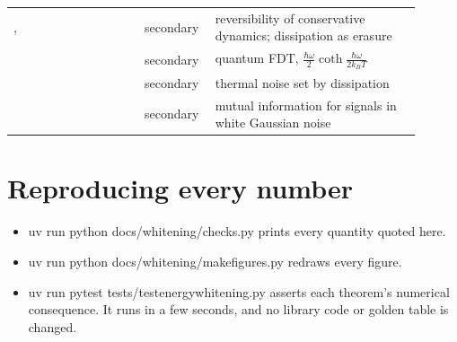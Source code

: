 \documentclass[11pt]{article}
\theoremstyle{definition}
\theoremstyle{remark}
\newcommand{\codeus}{\textunderscore\allowbreak}
\newcommand{\code}[1]{{\ttfamily\let\_\codeus\hyphenchar\font=-1 #1}}
\begin{document}
\begin{center}
\begin{tabular}{>{\raggedright}p{0.30\linewidth}p{0.13\linewidth}>{\raggedright\arraybackslash}p{0.47\linewidth}}
\citet{landauer1961irreversibility}, \citet{bennett1982thermodynamics} & secondary & reversibility of conservative dynamics; dissipation as erasure\\
\citet{callen1951irreversibility} & secondary & quantum FDT, $\frac{\hbar\omega}{2}\coth\frac{\hbar\omega}{2k_BT}$\\
\citet{nyquist1928thermal} & secondary & thermal noise set by dissipation\\
\citet{duncan1970calculation} & secondary & mutual information for signals in white Gaussian noise\\
\bottomrule
\end{tabular}
\end{center}

\section{Reproducing every number}
\label{app:repro}
\begin{itemize}[nosep]
\item \code{uv run python docs/whitening/checks.py} prints every quantity quoted here.
\item \code{uv run python docs/whitening/make\_figures.py} redraws every figure.
\item \code{uv run pytest tests/test\_energy\_whitening.py} asserts each theorem's numerical
  consequence. It runs in a few seconds, and no library code or golden table is changed.
\end{itemize}



\end{document}
